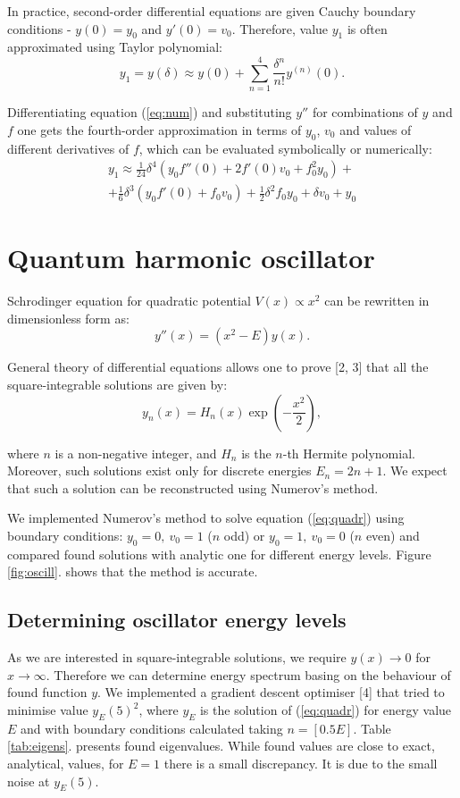 \documentclass{llncs}
\begin{document}
In practice, second-order differential equations are given Cauchy boundary conditions - $y(0)=y_0$ and $y'(0)=v_0$. Therefore, value $y_1$ is often approximated
using Taylor polynomial:
\begin{equation}
\label{eq:taylor}
y_1=y(\delta)\approx y(0)+ \sum_{n=1}^4 \frac{\delta^n}{n!} y^{(n)}(0).
\end{equation}

Differentiating equation (\ref{eq:num}) and substituting $y''$ for combinations of $y$ and $f$ one gets the fourth-order approximation in terms of $y_0$, $v_0$ and values of different derivatives of $f$, which can be evaluated symbolically or numerically:
\begin{align}
\label{eq:approx}
	y_1 \approx \frac{1}{24} \delta ^4\left(y_0 f''(0)+2 f'(0) v_0+f_0^2 y_0\right) + \\
	+\frac{1}{6} \delta ^3 \left(y_0 f'(0) +f_0 v_0\right)+\frac{1}{2} \delta ^2 f_0
   y_0+\delta  v_0+y_0
\end{align}

\section{Quantum harmonic oscillator}
Schrodinger equation for quadratic potential $V(x)\propto x^2$ can be rewritten in dimensionless form as:
\begin{equation}
  \label{eq:quadr}
  y''(x)=(x^2-E)y(x).
\end{equation}

General theory of differential equations allows one to prove [2, 3] that all the square-integrable solutions are given by:
\begin{equation}
  y_n(x)=H_n(x)\exp \left(-\frac{x^2}2\right),
\end{equation}

where $n$ is a non-negative integer, and $H_n$ is the $n$-th Hermite polynomial. Moreover, such solutions exist only for discrete energies $E_n=2n+1$. We expect that such a solution can be reconstructed using Numerov's method.

We implemented Numerov's method to solve equation (\ref{eq:quadr}) using boundary conditions: $y_0=0,~v_0=1$ ($n$ odd) or $y_0=1,~v_0=0$ ($n$ even) and compared found solutions with analytic one for different energy levels. Figure \ref{fig:oscill}. shows that the method is accurate.

\subsection{Determining oscillator energy levels}
As we are interested in square-integrable solutions, we require $y(x)\to 0$ for $x\to \infty$. Therefore we can determine energy spectrum basing on the behaviour of found function $y$. We implemented a gradient descent optimiser [4] that tried to minimise value $y_E(5)^2$, where $y_E$ is the solution of (\ref{eq:quadr}) for energy value $E$ and with boundary conditions calculated taking $n=[0.5E]$. Table \ref{tab:eigens}. presents found eigenvalues. While found values are close to exact, analytical, values, for $E=1$ there is a small discrepancy. It is due to the small noise at $y_E(5)$.
\end{document}
